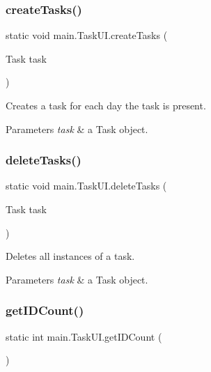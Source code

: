 \subsubsection{create\+Tasks()}
{\footnotesize\ttfamily static void main.\+Task\+U\+I.\+create\+Tasks (\begin{DoxyParamCaption}\item[{Task}]{task }\end{DoxyParamCaption})\hspace{0.3cm}{\ttfamily [static]}}

Creates a task for each day the task is present. 
\begin{DoxyParams}{Parameters}
{\em task} & a Task object. \\
\hline
\end{DoxyParams}
\mbox{\label{classmain_1_1_task_u_i_aaf62cc2f591422ee8ea9215fc0e0de64}} 
\subsubsection{delete\+Tasks()}
{\footnotesize\ttfamily static void main.\+Task\+U\+I.\+delete\+Tasks (\begin{DoxyParamCaption}\item[{Task}]{task }\end{DoxyParamCaption})\hspace{0.3cm}{\ttfamily [static]}}

Deletes all instances of a task. 
\begin{DoxyParams}{Parameters}
{\em task} & a Task object. \\
\hline
\end{DoxyParams}
\mbox{\label{classmain_1_1_task_u_i_a55fd82d2d4e828bee09c473b65b06232}} 
\subsubsection{get\+I\+D\+Count()}
{\footnotesize\ttfamily static int main.\+Task\+U\+I.\+get\+I\+D\+Count (\begin{DoxyParamCaption}{ }\end{DoxyParamCaption})\hspace{0.3cm}{\ttfamily [static]}}

